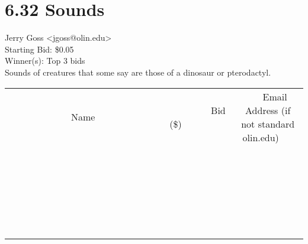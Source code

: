 \documentclass[11pt]{article}
\begin{document}
					\section*{6.32 Sounds}
					Jerry Goss <jgoss@olin.edu> \\
					Starting Bid: \$0.05 \\
					Winner(s): Top 3 bids \\
					Sounds of creatures that some say are those of a dinosaur or pterodactyl. \\
					[6ex]
					\begin{tabular}{c c c}
						~~~~~~~~~~~~~Name~~~~~~~~~~~~~ & ~~~~~~~~~Bid (\$)~~~~~~~~~ & ~~~Email Address (if not standard olin.edu)~~~ \\
				
 & & \\
\hline
 & & \\
\hline
 & & \\
\hline
 & & \\
\hline
 & & \\
\hline
 & & \\
\hline
 & & \\
\hline
 & & \\
\hline
 & & \\
\hline
 & & \\
\hline
 & & \\
\hline
 & & \\
\hline
 & & \\
\hline
 & & \\
\hline
 & & \\
\hline
 & & \\
\hline
 & & \\
\hline
 & & \\
\hline
 & & \\
\hline
 & & \\
\hline
 & & \\
\hline
 & & \\
\hline
 & & \\
\hline
 & & \\
\hline
 & & \\
\hline
 & & \\
\hline
					\end{tabular}
					\clearpage
				
\end{document}
